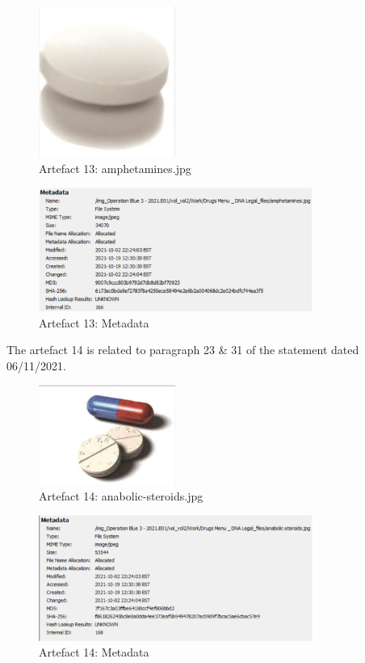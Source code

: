 \begin{figure}[H]
  \centering
  \includegraphics[width=0.4\textwidth]{figures/artefact13}
  \caption{Artefact 13: amphetamines.jpg}
  \label{f:artefact13}
\end{figure}
\begin{figure}[H]
  \centering
  \includegraphics[width=0.8\textwidth]{figures/meta13}
  \caption{Artefact 13: Metadata}
  \label{f:meta13}
\end{figure}
The artefact 14 is related to paragraph 23 \& 31 of the statement dated
06/11/2021.
\begin{figure}[H]
  \centering
  \includegraphics[width=0.4\textwidth]{figures/artefact14}
  \caption{Artefact 14: anabolic-steroids.jpg}
  \label{f:artefact14}
\end{figure}
\begin{figure}[H]
  \centering
  \includegraphics[width=0.8\textwidth]{figures/meta14}
  \caption{Artefact 14: Metadata}
  \label{f:meta14}
\end{figure}
